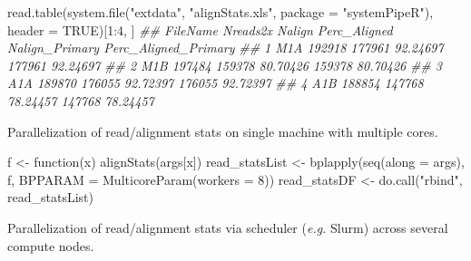 \documentclass[14pt,]{article}
\newcommand{\hlnum}[1]{\textcolor[rgb]{0.816,0.125,0.439}{#1}}%
\newcommand{\hlstr}[1]{\textcolor[rgb]{0.251,0.627,0.251}{#1}}%
\newcommand{\hlcom}[1]{\textcolor[rgb]{0.502,0.502,0.502}{\textit{#1}}}%
\newcommand{\hlstd}[1]{\textcolor[rgb]{0.251,0.251,0.251}{#1}}%
\newcommand{\hlkwd}[1]{\textcolor[rgb]{0.878,0.439,0.125}{#1}}%
\newenvironment{Shaded}{\begin{myshaded}}{\end{myshaded}}
\newcommand{\DecValTok}[1]{\hlnum{#1}}
\newcommand{\ConstantTok}[1]{\hlnum{#1}}
\newcommand{\SpecialCharTok}[1]{\hlstr{#1}}
\newcommand{\StringTok}[1]{\hlstr{#1}}
\newcommand{\DocumentationTok}[1]{\hlcom{#1}}
\newcommand{\OtherTok}[1]{{#1}}
\newcommand{\FunctionTok}[1]{\hlstd{#1}}
\newcommand{\ControlFlowTok}[1]{\hlkwd{#1}}
\newcommand{\AttributeTok}[1]{{#1}}
\newcommand{\NormalTok}[1]{\hlstd{#1}}
\begin{document}
\begin{Shaded}
\begin{Highlighting}[]
\FunctionTok{read.table}\NormalTok{(}\FunctionTok{system.file}\NormalTok{(}\StringTok{"extdata"}\NormalTok{, }\StringTok{"alignStats.xls"}\NormalTok{, }\AttributeTok{package =} \StringTok{"systemPipeR"}\NormalTok{), }\AttributeTok{header =} \ConstantTok{TRUE}\NormalTok{)[}\DecValTok{1}\SpecialCharTok{:}\DecValTok{4}\NormalTok{, }
\NormalTok{    ]}
\DocumentationTok{\#\#   FileName Nreads2x Nalign Perc\_Aligned Nalign\_Primary Perc\_Aligned\_Primary}
\DocumentationTok{\#\# 1      M1A   192918 177961     92.24697         177961             92.24697}
\DocumentationTok{\#\# 2      M1B   197484 159378     80.70426         159378             80.70426}
\DocumentationTok{\#\# 3      A1A   189870 176055     92.72397         176055             92.72397}
\DocumentationTok{\#\# 4      A1B   188854 147768     78.24457         147768             78.24457}
\end{Highlighting}
\end{Shaded}

Parallelization of read/alignment stats on single machine with multiple cores.

\begin{Shaded}
\begin{Highlighting}[]
\NormalTok{f }\OtherTok{\textless{}{-}} \ControlFlowTok{function}\NormalTok{(x) }\FunctionTok{alignStats}\NormalTok{(args[x])}
\NormalTok{read\_statsList }\OtherTok{\textless{}{-}} \FunctionTok{bplapply}\NormalTok{(}\FunctionTok{seq}\NormalTok{(}\AttributeTok{along =}\NormalTok{ args), f, }\AttributeTok{BPPARAM =} \FunctionTok{MulticoreParam}\NormalTok{(}\AttributeTok{workers =} \DecValTok{8}\NormalTok{))}
\NormalTok{read\_statsDF }\OtherTok{\textless{}{-}} \FunctionTok{do.call}\NormalTok{(}\StringTok{"rbind"}\NormalTok{, read\_statsList)}
\end{Highlighting}
\end{Shaded}

Parallelization of read/alignment stats via scheduler (\emph{e.g.} Slurm) across several compute nodes.
\end{document}
